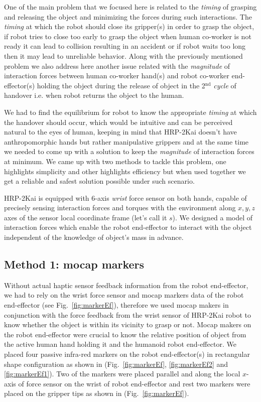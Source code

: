 One of the main problem that we focused here is related to the \textit{timing} of grasping and releasing the object and minimizing the forces during such interactions. The \textit{timing} at which the robot should close its gripper(s) in order to grasp the object, if robot tries to close too early to grasp the object when human co-worker is not ready it can lead to collision resulting in an accident or if robot waits too long then it may lead to unreliable behavior. Along with the previously mentioned problem we also address here another issue related with the \textit{magnitude} of interaction forces between human co-worker hand(s) and robot co-worker end-effector(s) holding the object during the release of object in the 2$^\text{nd}$ \textit{cycle} of handover i.e. when robot returns the object to the human.


We had to find the equilibrium for robot to know the appropriate \textit{timing} at which the handover should occur, which would be intuitive and can be perceived natural to the eyes of human, keeping in mind that HRP-2Kai doesn't have anthropomorphic hands but rather manipulative grippers and at the same time we needed to come up with a solution to keep the \textit{magnitude} of interaction forces at minimum. We came up with two methods to tackle this problem, one highlights simplicity and other highlights efficiency but when used together we get a reliable and safest solution possible under such scenario.


HRP-2Kai is equipped with 6-axis \textit{wrist} force sensor on both hands, capable of precisely sensing interaction forces and torques with the environment along $x, y, z$ axes of the sensor local coordinate frame (let's call it $s$). We designed a model of interaction forces which enable the robot end-effector to interact with the object independent of the knowledge of object's mass in advance.

\subsection{Method 1: mocap markers}

Without actual haptic sensor feedback information from the robot end-effector, we had to rely on the wrist force sensor and mocap markers data of the robot end-effector (see Fig.~\ref{fig:markerEf}), therefore we used mocap makers in conjunction with the force feedback from the wrist sensor of HRP-2Kai robot to know whether the object is within its vicinity to grasp or not. Mocap makers on the robot end-effector were crucial to know the relative position of object from the active human hand holding it and the humanoid robot end-effector. We placed four passive infra-red markers on the robot end-effector(s) in rectangular shape configuration as shown in (Fig.~\ref{fig:markerEf}, \ref{fig:markerEf2} and \ref{fig:markerEf1}). Two of the markers were placed parallel and along the local $x$-axis of force sensor on the wrist of robot end-effector and rest two markers were placed on the gripper tips as shown in (Fig.~\ref{fig:markerEf}).

